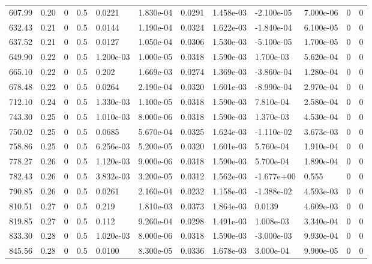 \documentclass[preview]{standalone}
\begin{document}
{{{\begin{tabular}{L{1.2cm}C{1.2cm} C{0.3cm}C{0.5cm} C{1.4cm}C{1.4cm} C{1.4cm}C{1.4cm} C{1.6cm}C{1.6cm} C{1.6cm}C{1.6cm}}
  607.99  &  0.20  & 0     & 0.5 &  0.0221  & 1.830e-04  &  0.0291&   1.458e-03& -2.100e-05 & 7.000e-06   &  0 & 0  \\ 
  632.43  &  0.21  & 0     & 0.5 &  0.0144  & 1.190e-04  &  0.0324&   1.622e-03& -1.840e-04 & 6.100e-05   &  0 & 0  \\ 
  637.52  &  0.21  & 0     & 0.5 &  0.0127  & 1.050e-04  &  0.0306&   1.530e-03& -5.100e-05 & 1.700e-05   &  0 & 0  \\ 
  649.90  &  0.22  & 0     & 0.5 &  1.200e-03  & 1.000e-05  &  0.0318&   1.590e-03& 1.700e-03 & 5.620e-04   &  0 & 0  \\ 
  665.10  &  0.22  & 0     & 0.5 &  0.202  & 1.669e-03  &  0.0274&   1.369e-03& -3.860e-04 & 1.280e-04   &  0 & 0  \\ 
  678.48  &  0.22  & 0     & 0.5 &  0.0264  & 2.190e-04  &  0.0320&   1.601e-03& -8.990e-04 & 2.970e-04   &  0 & 0  \\ 
  712.10  &  0.24  & 0     & 0.5 &  1.330e-03  & 1.100e-05  &  0.0318&   1.590e-03& 7.810e-04 & 2.580e-04   &  0 & 0  \\ 
  743.30  &  0.25  & 0     & 0.5 &  1.010e-03  & 8.000e-06  &  0.0318&   1.590e-03& 1.370e-03 & 4.530e-04   &  0 & 0  \\ 
  750.02  &  0.25  & 0     & 0.5 &  0.0685  & 5.670e-04  &  0.0325&   1.624e-03& -1.110e-02 & 3.673e-03   &  0 & 0  \\ 
  758.86  &  0.25  & 0     & 0.5 &  6.256e-03  & 5.200e-05  &  0.0320&   1.601e-03& 5.760e-04 & 1.910e-04   &  0 & 0  \\ 
  778.27  &  0.26  & 0     & 0.5 &  1.120e-03  & 9.000e-06  &  0.0318&   1.590e-03& 5.700e-04 & 1.890e-04   &  0 & 0  \\ 
  782.43  &  0.26  & 0     & 0.5 &  3.832e-03  & 3.200e-05  &  0.0312&   1.562e-03& -1.677e+00 & 0.555   &  0 & 0  \\ 
  790.85  &  0.26  & 0     & 0.5 &  0.0261  & 2.160e-04  &  0.0232&   1.158e-03& -1.388e-02 & 4.593e-03   &  0 & 0  \\ 
  810.51  &  0.27  & 0     & 0.5 &  0.219  & 1.810e-03  &  0.0373&   1.864e-03& 0.0139 & 4.609e-03   &  0 & 0  \\ 
  819.85  &  0.27  & 0     & 0.5 &  0.112  & 9.260e-04  &  0.0298&   1.491e-03& 1.008e-03 & 3.340e-04   &  0 & 0  \\ 
  833.30  &  0.28  & 0     & 0.5 &  1.020e-03  & 8.000e-06  &  0.0318&   1.590e-03& -3.000e-03 & 9.930e-04   &  0 & 0  \\ 
  845.56  &  0.28  & 0     & 0.5 &  0.0100  & 8.300e-05  &  0.0336&   1.678e-03& 3.000e-04 & 9.900e-05   &  0 & 0  \\ 

\end{tabular}}}}
\end{document}

